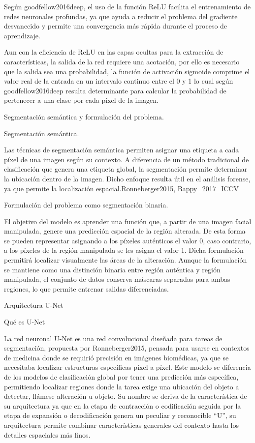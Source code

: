 Según goodfellow2016deep, el uso de la función ReLU facilita el entrenamiento de redes neuronales profundas, ya que ayuda a reducir el problema del gradiente desvanecido y permite una convergencia más rápida durante el proceso de aprendizaje.

Aun con la eficiencia de ReLU en las capas ocultas para la extracción de características, la salida de la red requiere una acotación, por ello es necesario que la salida sea una probabilidad, la función de activación sigmoide comprime el valor real de la entrada en un intervalo continuo entre el 0 y 1 lo cual según goodfellow2016deep resulta determinante para calcular la probabilidad de pertenecer a una clase por cada píxel de la imagen.

Segmentación semántica y formulación del problema.

Segmentación semántica.

Las técnicas de segmentación semántica permiten asignar una etiqueta a cada píxel de una imagen según su contexto. A diferencia de un método tradicional de clasificación que genera una etiqueta global, la segmentación permite determinar la ubicación dentro de la imagen. Dicho enfoque resulta útil en el análisis forense, ya que permite la localización espacial.Ronneberger2015, Bappy_2017_ICCV

Formulación del problema como segmentación binaria.

El objetivo del modelo es aprender una función que, a partir de una imagen facial manipulada, genere una predicción espacial de la región alterada. De esta forma se pueden representar asignando a los píxeles auténticos el valor 0, caso contrario, a los píxeles de la región manipulada se les asigna el valor 1. Dicha formulación permitirá localizar visualmente las áreas de la alteración. Aunque la formulación se mantiene como una distinción binaria entre región auténtica y región manipulada, el conjunto de datos conserva máscaras separadas para ambas regiones, lo que permite entrenar salidas diferenciadas.


Arquitectura U-Net

Qué es U-Net

La red neuronal U-Net es una red convolucional diseñada para tareas de segmentación, propuesta por Ronneberger2015, pensada para usarse en contextos de medicina donde se requirió precisión en imágenes biomédicas, ya que se necesitaba localizar estructuras específicas píxel a píxel. Este modelo se diferencia de los modelos de clasificación global por tener una predicción más específica, permitiendo localizar regiones donde la tarea exige una ubicación del objeto a detectar, llámese alteración u objeto. Su nombre se deriva de la característica de su arquitectura ya que en la etapa de contracción o codificación seguida por la etapa de expansión o decodificación genera un peculiar y reconocible “U”, su arquitectura permite combinar características generales del contexto hasta los detalles espaciales más finos.

